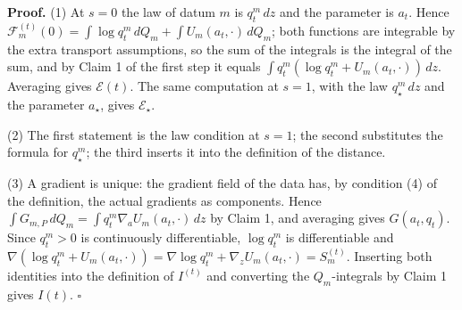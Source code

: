 \documentclass[11pt,a4paper]{report}
\begin{document}
\textbf{Proof.} (1) At \(s=0\) the law of datum \(m\) is \(q_t^m\,dz\) and the parameter is \(a_t\). Hence \(\mathcal F^{(t)}_m(0)=\int\log q_t^m\,dQ_m+\int U_m(a_t,\cdot)\,dQ_m\); both functions are integrable by the extra transport assumptions, so the sum of the integrals is the integral of the sum, and by Claim 1 of the first step it equals \(\int q_t^m(\log q_t^m+U_m(a_t,\cdot))\,dz\). Averaging gives \(\mathcal E(t)\). The same computation at \(s=1\), with the law \(q_\star^m\,dz\) and the parameter \(a_\star\), gives \(\mathcal E_\star\).




(2) The first statement is the law condition at \(s=1\); the second substitutes the formula for \(q_\star^m\); the third inserts it into the definition of the distance.




(3) A gradient is unique: the gradient field of the data has, by condition (4) of the definition, the actual gradients as components. Hence \(\int G_{m,P}\,dQ_m=\int q_t^m\nabla_aU_m(a_t,\cdot)\,dz\) by Claim 1, and averaging gives \(G(a_t,q_t)\). Since \(q_t^m>0\) is continuously differentiable, \(\log q_t^m\) is differentiable and \(\nabla(\log q_t^m+U_m(a_t,\cdot))=\nabla\log q_t^m+\nabla_zU_m(a_t,\cdot)=S^{(t)}_m\). Inserting both identities into the definition of \(I^{(t)}\) and converting the \(Q_m\)-integrals by Claim 1 gives \(I(t)\). \(\square\)
\end{document}
